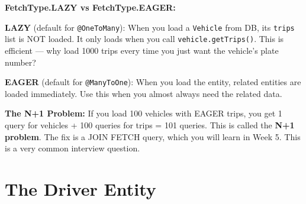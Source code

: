 \documentclass[12pt,a4paper]{report}
\newcommand{\code}[1]{\texttt{\textcolor{keywordblue}{#1}}}
\begin{document}
\begin{tcolorbox}[notebox]
\textbf{FetchType.LAZY vs FetchType.EAGER:}

\textbf{LAZY} (default for \code{@OneToMany}): When you load a \code{Vehicle} from DB, its \code{trips} list is NOT loaded. It only loads when you call \code{vehicle.getTrips()}. This is efficient --- why load 1000 trips every time you just want the vehicle's plate number?

\textbf{EAGER} (default for \code{@ManyToOne}): When you load the entity, related entities are loaded immediately. Use this when you almost always need the related data.

\textbf{The N+1 Problem:} If you load 100 vehicles with EAGER trips, you get 1 query for vehicles + 100 queries for trips = 101 queries. This is called the \textbf{N+1 problem}. The fix is a JOIN FETCH query, which you will learn in Week 5. This is a very common interview question.
\end{tcolorbox}

\section{The Driver Entity}
\end{document}
